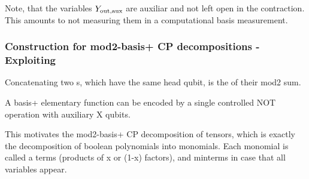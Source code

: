 \documentclass[aps,onecolumn,nofootinbib,pra]{article}
\newtheorem{lemma}{Lemma}
\begin{document}

    Note, that the variables $Y_{\mathrm{out},\mathrm{aux}}$ are auxiliar and not left open in the contraction.
    This amounts to not measuring them in a computational basis measurement.

    \subsubsection{Construction for mod2-basis+ CP decompositions - Exploiting \PolynomialSparsity{}}

    Concatenating two \computationCircuit{}s, which have the same head qubit, is the \computationCircuit{} of their mod2 sum.

    A basis+ elementary function can be encoded by a single controlled NOT operation with auxiliary X qubits.

    This motivates the mod2-basis+ CP decomposition of tensors, which is exactly the decomposition of boolean polynomials into monomials.
    Each monomial is called a terms (products of x or (1-x) factors), and minterms in case that all variables appear.
\end{document}
